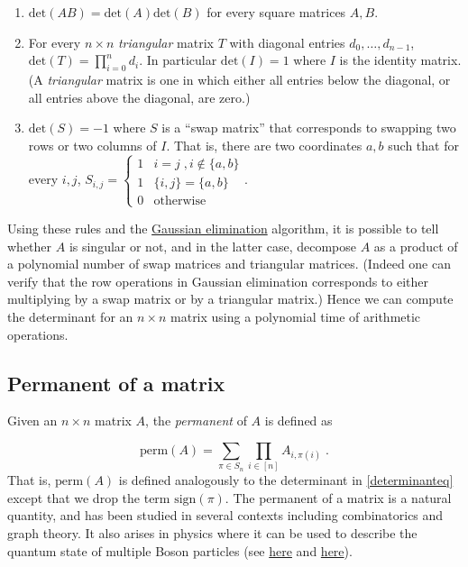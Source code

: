 \begin{enumerate}
\def\labelenumi{\arabic{enumi}.}
\item
  \(\mathrm{det}(\ensuremath{\mathit{AB}}) = \mathrm{det}(A)\mathrm{det}(B)\)
  for every square matrices \(A,B\).
\item
  For every \(n\times n\) \emph{triangular} matrix \(T\) with diagonal
  entries \(d_0,\ldots, d_{n-1}\),
  \(\mathrm{det}(T)=\prod_{i=0}^n d_i\). In particular
  \(\mathrm{det}(I)=1\) where \(I\) is the identity matrix. (A
  \emph{triangular} matrix is one in which either all entries below the
  diagonal, or all entries above the diagonal, are zero.)
\item
  \(\mathrm{det}(S)=-1\) where \(S\) is a ``swap matrix'' that
  corresponds to swapping two rows or two columns of \(I\). That is,
  there are two coordinates \(a,b\) such that for every \(i,j\),
  \(S_{i,j} = \begin{cases}1 & i=j\;, i \not\in \{a,b \} \\ 1 & \{i,j\}=\{a,b\} \\ 0 & \text{otherwise}\end{cases}\).
\end{enumerate}

Using these rules and the
\href{https://en.wikipedia.org/wiki/Gaussian_elimination}{Gaussian
elimination} algorithm, it is possible to tell whether \(A\) is singular
or not, and in the latter case, decompose \(A\) as a product of a
polynomial number of swap matrices and triangular matrices. (Indeed one
can verify that the row operations in Gaussian elimination corresponds
to either multiplying by a swap matrix or by a triangular matrix.) Hence
we can compute the determinant for an \(n\times n\) matrix using a
polynomial time of arithmetic operations.

\subsection{Permanent of a matrix}\label{Permanent-of-a-matrix}

Given an \(n\times n\) matrix \(A\), the \emph{permanent} of \(A\) is
defined as

\[
\mathrm{perm}(A) = \sum_{\pi \in S_n} \prod_{i\in [n]}A_{i,\pi(i)} \;. \label{permanenteq} 
\] That is, \(\mathrm{perm}(A)\) is defined analogously to the
determinant in \eqref{determinanteq} except that we drop the term
\(\mathrm{sign}(\pi)\). The permanent of a matrix is a natural quantity,
and has been studied in several contexts including combinatorics and
graph theory. It also arises in physics where it can be used to describe
the quantum state of multiple Boson particles (see
\href{http://www.cs.huji.ac.il/labs/learning/Papers/perm.pdf}{here} and
\href{https://en.wikipedia.org/wiki/Boson_sampling}{here}).

